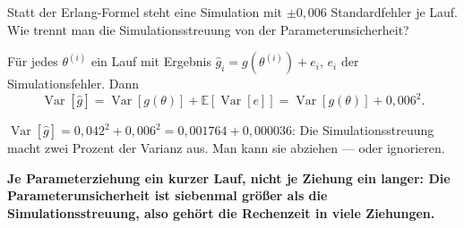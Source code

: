 \begin{aufgabe}
Statt der Erlang-Formel steht eine Simulation mit $\pm0{,}006$ Standardfehler je Lauf. Wie trennt man die Simulationsstreuung von der Parameterunsicherheit?

\loesung
{}
Für jedes $\theta^{(i)}$ ein Lauf mit Ergebnis $\hat g_i = g(\theta^{(i)}) + e_i$, $e_i$ der Simulationsfehler. Dann
\[ \operatorname{Var}[\hat g] = \operatorname{Var}[g(\theta)] + \mathbb E[\operatorname{Var}[e]] = \operatorname{Var}[g(\theta)] + 0{,}006^2 . \]

$\operatorname{Var}[\hat g] = 0{,}042^2 + 0{,}006^2 = 0{,}001764 + 0{,}000036$: Die Simulationsstreuung macht zwei Prozent der Varianz aus. Man kann sie abziehen --- oder ignorieren.

\begin{center}
\begin{minipage}{0.9\textwidth}
\textbf{Je Parameterziehung ein kurzer Lauf, nicht je Ziehung ein langer: Die Parameterunsicherheit ist siebenmal größer als die Simulationsstreuung, also gehört die Rechenzeit in viele Ziehungen.}
\end{minipage}
\end{center}

\begin{center}
\begin{minipage}{0.88\textwidth}
\end{minipage}
\end{center}
\end{aufgabe}

